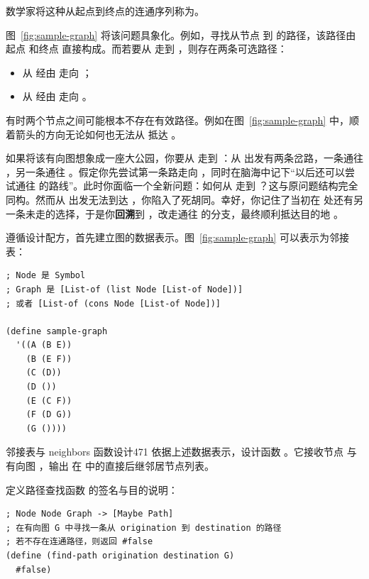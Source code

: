 数学家将这种从起点到终点的连通序列称为。

图~\ref{fig:sample-graph} 将该问题具象化。例如，寻找从节点  到  的路径，该路径由起点  和终点  直接构成。而若要从  走到 ，则存在两条可选路径：
\begin{itemize}
  \item 从  经由  走向 ；
  \item 从  经由  走向 。
\end{itemize}
有时两个节点之间可能根本不存在有效路径。例如在图~\ref{fig:sample-graph} 中，顺着箭头的方向无论如何也无法从  抵达 。

如果将该有向图想象成一座大公园，你要从  走到 ：从  出发有两条岔路，一条通往 ，另一条通往 。假定你先尝试第一条路走向 ，同时在脑海中记下“以后还可以尝试通往  的路线”。此时你面临一个全新问题：如何从  走到 ？这与原问题结构完全同构。然而从  出发无法到达 ，你陷入了死胡同。幸好，你记住了当初在  处还有另一条未走的选择，于是你\textbf{回溯}到 ，改走通往  的分支，最终顺利抵达目的地 。

遵循设计配方，首先建立图的数据表示。图~\ref{fig:sample-graph} 可以表示为邻接表：
\begin{lstlisting}[language=BSL]
; Node 是 Symbol
; Graph 是 [List-of (list Node [List-of Node])]
; 或者 [List-of (cons Node [List-of Node])]

(define sample-graph
  '((A (B E))
    (B (E F))
    (C (D))
    (D ())
    (E (C F))
    (F (D G))
    (G ())))
\end{lstlisting}

\begin{exercise}{邻接表与 neighbors 函数设计}{471}\label{ex:471}
依据上述数据表示，设计函数 。它接收节点  与有向图 ，输出  在  中的直接后继邻居节点列表。
\end{exercise}

定义路径查找函数  的签名与目的说明：
\begin{lstlisting}[language=BSL]
; Node Node Graph -> [Maybe Path]
; 在有向图 G 中寻找一条从 origination 到 destination 的路径
; 若不存在连通路径，则返回 #false
(define (find-path origination destination G)
  #false)
\end{lstlisting}

